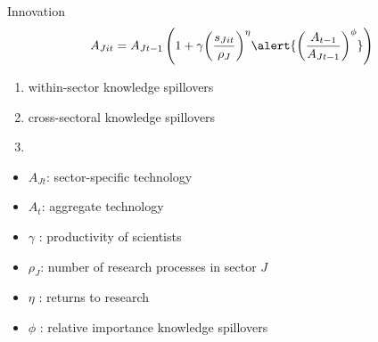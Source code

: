 \documentclass[11pt,aspectratio=169]{beamer}
\begin{document}
\addtocounter{framenumber}{-1}
\begin{frame}{Innovation}
	\vspace{-5mm}
	\large
	\begin{align*}
		A_{Jit}={A_{Jt-1}}\left(1+\gamma{\left(\frac{s_{Jit}}{\rho_J}\right)^{\eta}}\alert{{\left(\frac{A_{t-1}}{A_{Jt-1}}\right)^\phi}}\right)
	\end{align*}
	\normalsize
	\begin{enumerate}
		\item within-sector knowledge spillovers %
		\item \alert{cross-sectoral knowledge spillovers}
		\item[] \  %
	\end{enumerate}
	\small
	\vspace{4mm}
	\hspace{-2mm}
	\begin{minipage}[t!]{0.43\textwidth}
		\vspace{0mm}
		\begin{itemize}
			\item[] $A_{Jt}$: sector-specific technology
			\vspace{-2mm}		
			\item[] $A_t$: aggregate technology
			\vspace{-2mm}
			\item[] $\gamma$ : productivity of scientists
		\end{itemize}
	\end{minipage}
	\vspace{-5mm}
	\begin{minipage}[t!]{0.55\textwidth}
		\vspace{0mm}
		\begin{itemize}	
			\item[] {$\rho_J$: number of research processes in sector $J$}
			\vspace{-2mm}			
			\item[] $\eta$ : returns to research
			\vspace{-2mm}			
			\item[] $\phi$ : relative importance knowledge spillovers
		\end{itemize}
	\end{minipage}
\end{frame}
\end{document}

